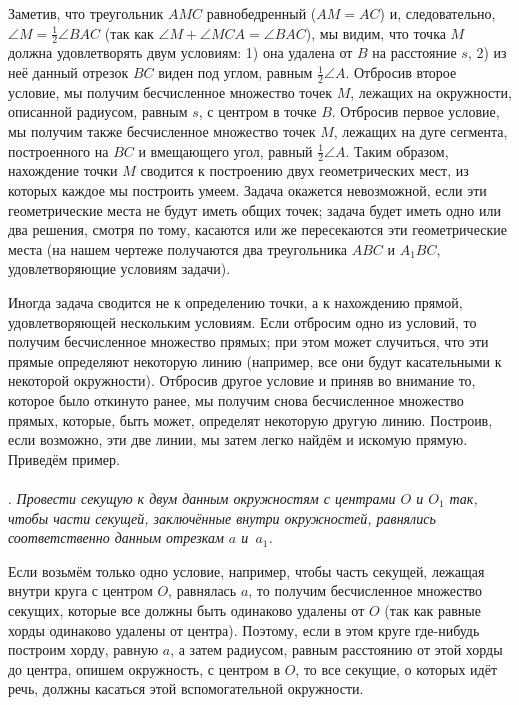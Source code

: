 \documentclass[oneside]{book}
\begin{document}
Заметив, что треугольник $AMC$ равнобедренный ($AM=AC$) и, следовательно, $\angle M =  \tfrac12\angle BAC$ (так как $\angle M+\angle MCA = \angle BAC$), мы видим, что точка $M$ должна удовлетворять двум условиям:
1) она удалена от $B$ на расстояние $s$, 
2) из неё данный отрезок $BC$ виден под углом, равным $\tfrac12\angle A$.
Отбросив второе условие, мы получим бесчисленное множество точек $M$, лежащих на окружности, описанной радиусом, равным $s$, с центром в точке $B$.
Отбросив первое условие, мы получим также бесчисленное множество точек $M$, лежащих на дуге сегмента, построенного на $BC$ и вмещающего угол, равный $\tfrac12\angle A$.
Таким образом, нахождение точки $M$ сводится к построению двух геометрических мест, из которых каждое мы построить умеем.
Задача окажется невозможной, если эти геометрические места не будут иметь общих точек;
задача будет иметь одно или два решения, смотря по тому, касаются или же пересекаются эти геометрические места (на нашем чертеже получаются два треугольника $ABC$ и $A_1BC$, удовлетворяющие условиям задачи).

\medskip

Иногда задача сводится не к определению точки, а к нахождению прямой, удовлетворяющей нескольким условиям.
Если отбросим одно из условий, то получим бесчисленное множество прямых;
при этом может случиться, что эти прямые определяют некоторую линию (например, все они будут касательными к некоторой окружности).
Отбросив другое условие и приняв во внимание то, которое было откинуто ранее, мы получим снова бесчисленное множество прямых, которые, быть может, определят некоторую другую линию.
Построив, если возможно, эти две линии, мы затем легко найдём и искомую прямую.
Приведём пример.

\paragraph{}\label{1938/135}
.
\emph{Провести секущую к двум данным окружностям с центрами $O$ и $O_1$ так, чтобы части секущей, заключённые внутри окружностей, равнялись соответственно данным отрезкам $a$ и~$a_1$.}


Если возьмём только одно условие, например, чтобы часть секущей, лежащая внутри круга  с центром $O$, равнялась $a$, то получим бесчисленное множество секущих, которые все должны быть одинаково удалены от $O$ (так как равные хорды одинаково удалены от центра).
Поэтому, если в этом круге где-нибудь построим хорду, равную $a$, а затем радиусом, равным расстоянию от этой хорды до центра, опишем окружность, с центром в $O$, то все секущие, о которых идёт речь, должны касаться этой вспомогательной окружности.
\end{document}
